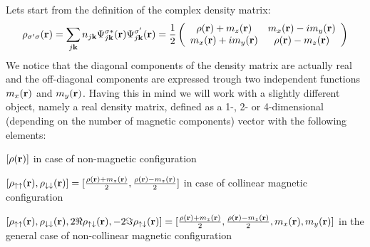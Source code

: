 Let\textquotesingle{}s start from the definition of the complex density matrix\+: \[ \rho_{\sigma' \sigma}({\bf r}) = \sum_{j{\bf k}} n_{j{\bf k}} \Psi_{j{\bf k}}^{\sigma*}({\bf r}) \Psi_{j{\bf k}}^{\sigma'}({\bf r}) = \frac{1}{2} \left( \begin{array}{cc} \rho({\bf r})+m_z({\bf r}) & m_x({\bf r})-im_y({\bf r}) \\ m_x({\bf r})+im_y({\bf r}) & \rho({\bf r})-m_z({\bf r}) \end{array} \right) \] We notice that the diagonal components of the density matrix are actually real and the off-\/diagonal components are expressed trough two independent functions $ m_x({\bf r}) $ and $ m_y({\bf r}) $. Having this in mind we will work with a slightly different object, namely a real density matrix, defined as a 1-\/, 2-\/ or 4-\/dimensional (depending on the number of magnetic components) vector with the following elements\+:
\begin{DoxyItemize}
\item $ [ \rho({\bf r}) ] $ in case of non-\/magnetic configuration
\item $ [ \rho_{\uparrow \uparrow}({\bf r}), \rho_{\downarrow \downarrow}({\bf r}) ] = [ \frac{\rho({\bf r})+m_z({\bf r})}{2}, \frac{\rho({\bf r})-m_z({\bf r})}{2} ] $ in case of collinear magnetic configuration
\item $ [ \rho_{\uparrow \uparrow}({\bf r}), \rho_{\downarrow \downarrow}({\bf r}), 2 \Re \rho_{\uparrow \downarrow}({\bf r}), -2 \Im \rho_{\uparrow \downarrow}({\bf r}) ] = [ \frac{\rho({\bf r})+m_z({\bf r})}{2}, \frac{\rho({\bf r})-m_z({\bf r})}{2}, m_x({\bf r}), m_y({\bf r}) ] $ in the general case of non-\/collinear magnetic configuration
\end{DoxyItemize}

